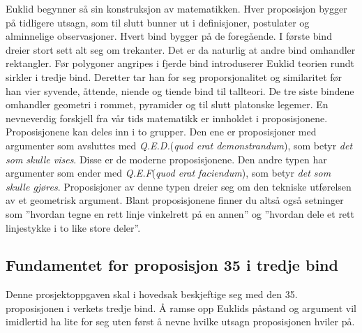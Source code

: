 \documentclass[norsk,twoside,utf8]{article}
\begin{document}
Euklid begynner så sin konstruksjon av matematikken. Hver proposisjon bygger på tidligere utsagn, som til slutt bunner ut i definisjoner, postulater og alminnelige observasjoner. Hvert bind bygger på de foregående. I første bind dreier stort sett alt seg om trekanter. Det er da naturlig at andre bind omhandler rektangler. Før polygoner angripes i fjerde bind introduserer Euklid teorien rundt sirkler i tredje bind. Deretter tar han for seg proporsjonalitet og similaritet før han vier syvende, åttende, niende og tiende bind til tallteori. De tre siste bindene omhandler geometri i rommet, pyramider og til slutt platonske legemer. En nevneverdig forskjell fra vår tids matematikk er innholdet i proposisjonene. Proposisjonene kan deles inn i to grupper. Den ene er proposisjoner med argumenter som avsluttes med \textit{Q.E.D.}(\textit{quod erat demonstrandum}), som betyr \textit{det som skulle vises}. Disse er de moderne proposisjonene. Den andre typen har argumenter som ender med \textit{Q.E.F}(\textit{quod erat faciendum}), som betyr \textit{det som skulle gjøres}. Proposisjoner av denne typen dreier seg om den tekniske utførelsen av et geometrisk argument. Blant proposisjonene finner du altså også setninger som ''hvordan tegne en rett linje vinkelrett på en annen'' og ''hvordan dele et rett linjestykke i to like store deler''.



\subsection{Fundamentet for proposisjon 35 i tredje bind}
Denne prosjektoppgaven skal i hovedsak beskjeftige seg med den 35. proposisjonen i verkets tredje bind. Å ramse opp Euklids påstand og argument vil imidlertid ha lite for seg uten først å nevne hvilke utsagn proposisjonen hviler på. 
\end{document}
